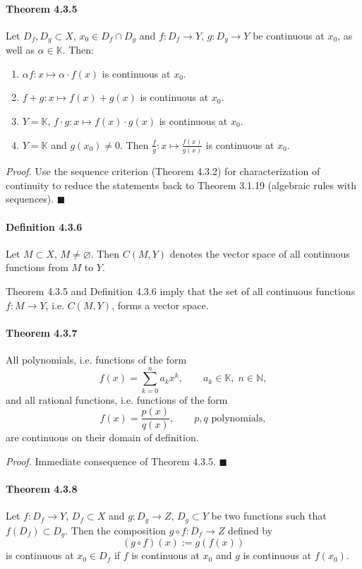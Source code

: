 \documentclass[12pt]{article}
\begin{document}
	\paragraph{Theorem 4.3.5} Let $D_f, D_g \subset X$, $x_0 \in D_f \cap D_g$ and $f : D_f \to Y$, $g : D_g \to Y$ be continuous at $x_0$, as well as $\alpha \in \mathbb K$. Then:
	\begin{enumerate}[label=({\arabic*})]
		\item $\alpha f : x \mapsto \alpha\cdot f(x)$ is continuous at $x_0$.
		\item $f + g : x \mapsto f(x) + g(x)$ is continuous at $x_0$.
		\item $Y = \mathbb K$, $f \cdot g : x \mapsto f(x)\cdot g(x)$ is continuous at $x_0$.
		\item $Y = \mathbb K$ and $g(x_0) \neq 0$. Then $\frac{f}{g} : x \mapsto \frac{f(x)}{g(x)}$ is continuous at $x_0$.
	\end{enumerate}
	\emph{Proof.} Use the sequence criterion (Theorem 4.3.2) for characterization of continuity to reduce the statements back to Theorem 3.1.19 (algebraic rules with sequences). \hfill $\blacksquare$

	\paragraph{Definition 4.3.6} Let $M \subset X$, $M \neq \varnothing$. Then $C(M,Y)$ denotes the vector space of all continuous functions from $M$ to $Y$.

	Theorem 4.3.5 and Definition 4.3.6 imply that the set of all continuous functions $f : M \to Y$, i.e. $C(M,Y)$, forms a vector space.

	\paragraph{Theorem 4.3.7} All polynomials, i.e. functions of the form
	\[
		f(x) = \sum_{k=0}^{n} a_k x^k, \qquad a_k \in \mathbb K,\; n \in \mathbb N,
	\]
	and all rational functions, i.e. functions of the form
	\[
		f(x) = \frac{p(x)}{q(x)}, \qquad p,q \text{ polynomials},
	\]
	are continuous on their domain of definition.

	\emph{Proof.} Immediate consequence of Theorem 4.3.5. \hfill $\blacksquare$

	\paragraph{Theorem 4.3.8} Let $f : D_f \to Y$, $D_f \subset X$ and $g : D_g \to Z$, $D_g \subset Y$ be two functions such that $f(D_f) \subset D_g$. Then the composition $g \circ f : D_f \to Z$ defined by
	\[
		(g \circ f)(x) := g(f(x))
	\]
	is continuous at $x_0 \in D_f$ if $f$ is continuous at $x_0$ and $g$ is continuous at $f(x_0)$.
\end{document}
